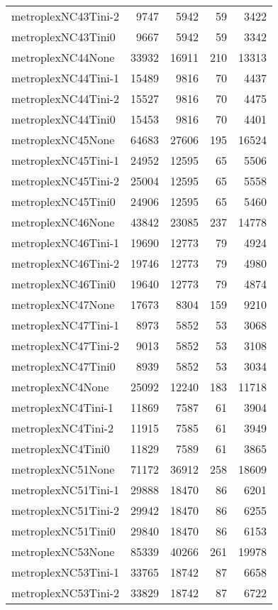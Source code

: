 \begin{longtable}{lrrrr}
metroplexNC43Tini-2 & 9747 & 5942 & 59 & 3422 \\
metroplexNC43Tini0 & 9667 & 5942 & 59 & 3342 \\
metroplexNC44None & 33932 & 16911 & 210 & 13313 \\
metroplexNC44Tini-1 & 15489 & 9816 & 70 & 4437 \\
metroplexNC44Tini-2 & 15527 & 9816 & 70 & 4475 \\
metroplexNC44Tini0 & 15453 & 9816 & 70 & 4401 \\
metroplexNC45None & 64683 & 27606 & 195 & 16524 \\
metroplexNC45Tini-1 & 24952 & 12595 & 65 & 5506 \\
metroplexNC45Tini-2 & 25004 & 12595 & 65 & 5558 \\
metroplexNC45Tini0 & 24906 & 12595 & 65 & 5460 \\
metroplexNC46None & 43842 & 23085 & 237 & 14778 \\
metroplexNC46Tini-1 & 19690 & 12773 & 79 & 4924 \\
metroplexNC46Tini-2 & 19746 & 12773 & 79 & 4980 \\
metroplexNC46Tini0 & 19640 & 12773 & 79 & 4874 \\
metroplexNC47None & 17673 & 8304 & 159 & 9210 \\
metroplexNC47Tini-1 & 8973 & 5852 & 53 & 3068 \\
metroplexNC47Tini-2 & 9013 & 5852 & 53 & 3108 \\
metroplexNC47Tini0 & 8939 & 5852 & 53 & 3034 \\
metroplexNC4None & 25092 & 12240 & 183 & 11718 \\
metroplexNC4Tini-1 & 11869 & 7587 & 61 & 3904 \\
metroplexNC4Tini-2 & 11915 & 7585 & 61 & 3949 \\
metroplexNC4Tini0 & 11829 & 7589 & 61 & 3865 \\
metroplexNC51None & 71172 & 36912 & 258 & 18609 \\
metroplexNC51Tini-1 & 29888 & 18470 & 86 & 6201 \\
metroplexNC51Tini-2 & 29942 & 18470 & 86 & 6255 \\
metroplexNC51Tini0 & 29840 & 18470 & 86 & 6153 \\
metroplexNC53None & 85339 & 40266 & 261 & 19978 \\
metroplexNC53Tini-1 & 33765 & 18742 & 87 & 6658 \\
metroplexNC53Tini-2 & 33829 & 18742 & 87 & 6722 \\

\end{longtable}
